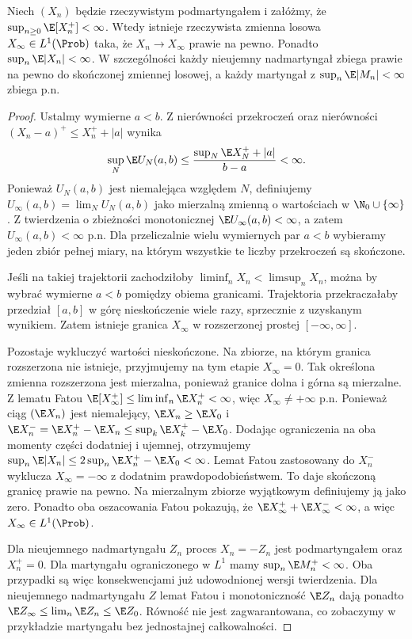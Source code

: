 \begin{twierdzenie}
Niech $(X_n)$ będzie rzeczywistym podmartyngałem
i załóżmy, że
$\sup_{n\geq0}\E[X_n^+]<\infty$.
Wtedy istnieje rzeczywista zmienna losowa
$X_\infty\in L^1(\Prob)$ taka, że
$X_n\to X_\infty$ prawie na pewno. Ponadto
$\sup_n\E|X_n|<\infty$.
W szczególności każdy nieujemny nadmartyngał
zbiega prawie na pewno do skończonej zmiennej
losowej, a każdy martyngał z
$\sup_n\E|M_n|<\infty$ zbiega p.n.
\end{twierdzenie}
\begin{proof}
Ustalmy wymierne $a<b$. Z nierówności przekroczeń
oraz nierówności
$(X_n-a)^+\leq X_n^++|a|$
wynika
\[
\sup_N\E U_N(a,b)
\leq\frac{\sup_N\E X_N^++|a|}{b-a}<\infty.
\]
Ponieważ $U_N(a,b)$ jest niemalejąca względem $N$,
definiujemy $U_\infty(a,b)=\lim_N U_N(a,b)$
jako mierzalną zmienną o wartościach w
$\N_0\cup\{\infty\}$. Z twierdzenia o zbieżności
monotonicznej
$\E U_\infty(a,b)<\infty$, a zatem
$U_\infty(a,b)<\infty$ p.n. Dla przeliczalnie
wielu wymiernych par $a<b$ wybieramy jeden
zbiór pełnej miary, na którym wszystkie te liczby
przekroczeń są skończone.

Jeśli na takiej trajektorii zachodziłoby
$\liminf_n X_n<\limsup_n X_n$, można by
wybrać wymierne $a<b$ pomiędzy obiema granicami.
Trajektoria przekraczałaby przedział $[a,b]$
w górę nieskończenie wiele razy, sprzecznie
z uzyskanym wynikiem. Zatem istnieje granica
$X_\infty$ w rozszerzonej prostej $[-\infty,\infty]$.

Pozostaje wykluczyć wartości nieskończone.
Na zbiorze, na którym granica rozszerzona
nie istnieje, przyjmujemy na tym etapie $X_\infty=0$.
Tak określona zmienna rozszerzona jest mierzalna,
ponieważ granice dolna i górna są mierzalne.
Z lematu Fatou
$\E[X_\infty^+]\leq\liminf_n\E X_n^+<\infty$,
więc $X_\infty\ne+\infty$ p.n.
Ponieważ ciąg $(\E X_n)$ jest niemalejący,
$\E X_n\geq\E X_0$ i
$\E X_n^-=\E X_n^+-\E X_n
\leq\sup_k\E X_k^+-\E X_0$.
Dodając ograniczenia na oba momenty części
dodatniej i ujemnej, otrzymujemy
$\sup_n\E|X_n|\leq2\sup_n\E X_n^+-\E X_0<\infty$.
Lemat Fatou zastosowany do $X_n^-$ wyklucza
$X_\infty=-\infty$ z dodatnim prawdopodobieństwem.
To daje skończoną granicę prawie na pewno.
Na mierzalnym zbiorze wyjątkowym definiujemy ją jako zero.
Ponadto oba oszacowania Fatou pokazują, że
$\E X_\infty^+ + \E X_\infty^-<\infty$,
a więc $X_\infty\in L^1(\Prob)$.

Dla nieujemnego nadmartyngału $Z_n$ proces
$X_n=-Z_n$ jest podmartyngałem oraz
$X_n^+=0$. Dla martyngału ograniczonego w $L^1$
mamy $\sup_n\E M_n^+<\infty$.
Oba przypadki są więc konsekwencjami już
udowodnionej wersji twierdzenia.
Dla nieujemnego nadmartyngału $Z$ lemat Fatou
i monotoniczność $\E Z_n$ dają ponadto
$\E Z_\infty\leq\lim_n\E Z_n\leq\E Z_0$.
Równość nie jest zagwarantowana, co zobaczymy
w przykładzie martyngału bez jednostajnej całkowalności.
\end{proof}

